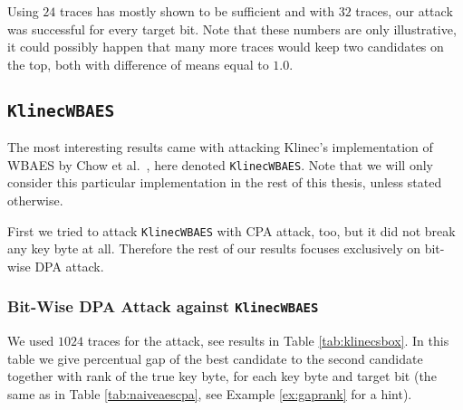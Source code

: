 	Using $24$ traces has mostly shown to be sufficient and with $32$ traces, our attack was successful for every target bit. Note that these numbers are only illustrative, it could possibly happen that many more traces would keep two candidates on the top, both with difference of means equal to $1.0$.
	



\subsection{\tt KlinecWBAES}
\label{sec:klinecwbaes}

The most interesting results came with attacking Klinec's implementation \cite{klinec2013implementation} of WBAES by Chow et al.\ \cite{chow2002aes}, here denoted {\tt KlinecWBAES}. Note that we will only consider this particular implementation in the rest of this thesis, unless stated otherwise.

First we tried to attack {\tt KlinecWBAES} with CPA attack, too, but it did not break any key byte at all. Therefore the rest of our results focuses exclusively on bit-wise DPA attack.

\subsubsection{Bit-Wise DPA Attack against {\tt KlinecWBAES}}
	
	We used $1024$ traces for the attack, see results in Table \ref{tab:klinecsbox}. In this table we give percentual gap of the best candidate to the second candidate together with rank of the true key byte, for each key byte and target bit (the same as in Table \ref{tab:naiveaescpa}, see Example \ref{ex:gaprank} for a hint).
	
	
